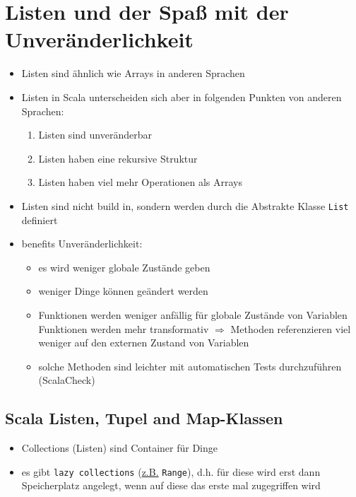 \section{Listen und der Spaß mit der Unveränderlichkeit}
\begin{itemize}
  \item Listen sind ähnlich wie Arrays in anderen Sprachen
  
  
  
  \item Listen in Scala unterscheiden sich aber in folgenden Punkten von
  anderen Sprachen: \begin{enumerate}
    \item Listen sind unveränderbar
    \item Listen haben eine rekursive Struktur
    \item Listen haben viel mehr Operationen als Arrays
  \end{enumerate}
  \item Listen sind nicht build in, sondern werden durch die Abstrakte Klasse
  \texttt{List} definiert
  \item benefits Unveränderlichkeit:
  \begin{itemize}
    \item es wird weniger globale Zustände geben
    \item weniger Dinge können geändert werden
    \item Funktionen werden weniger anfällig für globale Zustände von Variablen \und Funktionen werden mehr transformativ $\Rightarrow$ Methoden
    referenzieren viel weniger auf den externen Zustand von Variablen
    \item solche Methoden sind leichter mit automatischen Tests durchzuführen
    (ScalaCheck)
  \end{itemize}
\end{itemize}


\subsection{Scala Listen, Tupel and Map-Klassen}
\begin{itemize}
  \item Collections (Listen) sind Container für Dinge
  
  

  \item es gibt \texttt{lazy collections} (\uline{z.B.} \texttt{Range}), d.h. für diese wird erst dann 
  Speicherplatz angelegt, wenn auf diese das erste mal zugegriffen wird
  
  
\end{itemize}


